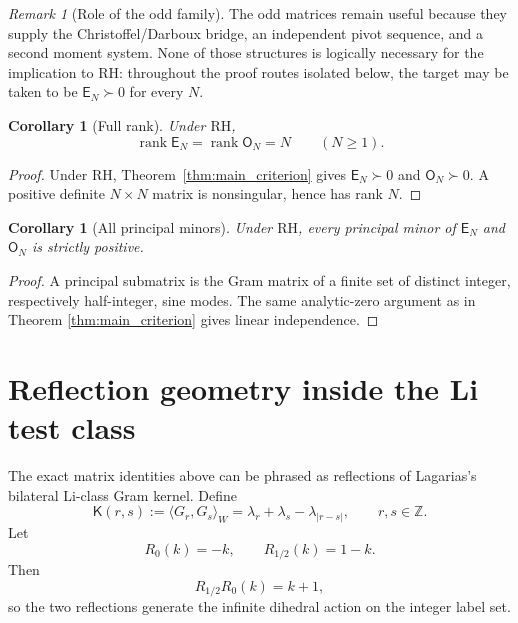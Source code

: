 \documentclass[11pt]{amsart}
\numberwithin{equation}{section}
\theoremstyle{plain}
\newtheorem{corollary}[theorem]{Corollary}
\theoremstyle{definition}
\theoremstyle{remark}
\newtheorem{remark}[theorem]{Remark}
\newcommand{\RH}{\mathrm{RH}}
\newcommand{\E}{\mathsf E}
\newcommand{\Omat}{\mathsf O}
\newcommand{\Kmat}{\mathsf K}
\newcommand{\rank}{\operatorname{rank}}
\begin{document}
\begin{remark}[Role of the odd family]
\label{rem:odd_not_needed_RH}
The odd matrices remain useful because they supply the Christoffel/Darboux bridge, an independent
pivot sequence, and a second moment system.  None of those structures is logically necessary for the
implication to \(\RH\): throughout the proof routes isolated below, the target may be taken to be
\(\E_N\succ0\) for every \(N\).
\end{remark}

\begin{corollary}[Full rank]
\label{cor:full_rank}
Under $\RH$,
\begin{equation}
\rank \E_N=\rank \Omat_N=N
\qquad(N\ge1).
\label{eq:full_rank}
\end{equation}
\end{corollary}

\begin{proof}
Under \(\RH\), Theorem~\ref{thm:main_criterion} gives
\(\E_N\succ0\) and \(\Omat_N\succ0\).  A positive definite \(N\times N\)
matrix is nonsingular, hence has rank \(N\).
\end{proof}

\begin{corollary}[All principal minors]
\label{cor:all_principal_minors}
Under $\RH$, every principal minor of $\E_N$ and $\Omat_N$ is strictly positive.
\end{corollary}

\begin{proof}
A principal submatrix is the Gram matrix of a finite set of distinct integer, respectively half-integer, sine modes. The same analytic-zero argument as in Theorem \ref{thm:main_criterion} gives linear independence.
\end{proof}

\section{Reflection geometry inside the Li test class}
\label{sec:reflection_compression}

The exact matrix identities above can be phrased as reflections of Lagarias's bilateral Li-class Gram kernel. Define
\begin{equation}
\Kmat(r,s):=\langle G_r,G_s\rangle_W
=\lambda_r+\lambda_s-\lambda_{|r-s|},
\qquad r,s\in\mathbb Z.
\label{eq:bilateral_kernel}
\end{equation}
Let
\begin{equation}
R_0(k)=-k,
\qquad
R_{1/2}(k)=1-k.
\label{eq:two_reflections}
\end{equation}
Then
\begin{equation}
R_{1/2}R_0(k)=k+1,
\label{eq:reflection_translation}
\end{equation}
so the two reflections generate the infinite dihedral action on the integer label set.
\end{document}
